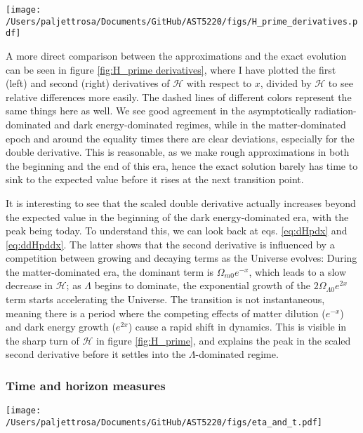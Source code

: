 \documentclass{aa}
\numberwithin{equation}{section}
\numberwithin{table}{section}
\numberwithin{figure}{section}
\begin{document}
\begin{figure*}
    \centering
    \texttt{[image: /Users/paljettrosa/Documents/GitHub/AST5220/figs/H\_prime\_derivatives.pdf]}
    \caption{Comparison of exact evolutions (black) with approximations (dashed) for the scaled first and second derivatives of $\mathcal{H}(x)$. Agreement is good in pure radiation and matter domination but deviates near transitions due to neglected components.}\label{fig:H_prime derivatives}
\end{figure*}

A more direct comparison between the approximations and the exact evolution can be seen in figure \ref{fig:H_prime derivatives}, where I have plotted the first (left) and second (right) derivatives of $\mathcal{H}$ with respect to $x$, divided by $\mathcal{H}$ to see relative differences more easily. The dashed lines of different colors represent the same things here as well. We see good agreement in the asymptotically radiation-dominated and dark energy-dominated regimes, while in the matter-dominated epoch and around the equality times there are clear deviations, especially for the double derivative. This is reasonable, as we make rough approximations in both the beginning and the end of this era, hence the exact solution barely has time to sink to the expected value before it rises at the next transition point. 

It is interesting to see that the scaled double derivative actually increases beyond the expected value in the beginning of the dark energy-dominated era, with the peak being today. To understand this, we can look back at eqs. \eqref{eq:dHpdx} and \eqref{eq:ddHpddx}. The latter shows that the second derivative is influenced by a competition between growing and decaying terms as the Universe evolves: During the matter-dominated era, the dominant term is $\Omega_{m0} e^{-x}$, which leads to a slow decrease in $\mathcal{H}$; as $\Lambda$ begins to dominate, the exponential growth of the $2\Omega_{\Lambda 0} e^{2x}$ term starts accelerating the Universe. The transition is not instantaneous, meaning there is a period where the competing effects of matter dilution ($e^{-x}$) and dark energy growth ($e^{2x}$) cause a rapid shift in dynamics. This is visible in the sharp turn of $\mathcal{H}$ in figure \ref{fig:H_prime}, and explains the peak in the scaled second derivative before it settles into the $\Lambda$-dominated regime.


\subsubsection{Time and horizon measures}
\begin{figure*}
  \centering
  \texttt{[image: /Users/paljettrosa/Documents/GitHub/AST5220/figs/eta\_and\_t.pdf]}
  \caption{Conformal time $\eta(x)$ (grey) and cosmic time $t(x)$ (black) compared with analytical approximations (dashed). Deviations near equality points arise due to gradual transitions between dominant energy components. This is highlighted in the bottom subplots for the cosmic time.}\label{fig:eta and t}
\end{figure*}
\end{document}
